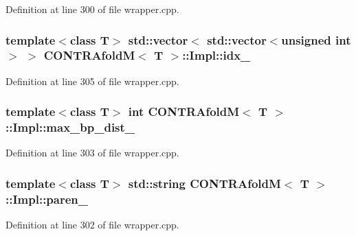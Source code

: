 Definition at line 300 of file wrapper.\+cpp.

\hypertarget{struct_c_o_n_t_r_afold_m_1_1_impl_ae0d86d3732f74d42ba6cc5993185aebb}{
\subsubsection[{idx\+\_\+}]{\setlength{\rightskip}{0pt plus 5cm}template$<$class T$>$ std\+::vector$<$ std\+::vector$<$unsigned int$>$ $>$ {\bf C\+O\+N\+T\+R\+Afold\+M}$<$ T $>$\+::Impl\+::idx\+\_\+}}\label{struct_c_o_n_t_r_afold_m_1_1_impl_ae0d86d3732f74d42ba6cc5993185aebb}


Definition at line 305 of file wrapper.\+cpp.

\hypertarget{struct_c_o_n_t_r_afold_m_1_1_impl_a9bf98e3520a857cc2f74c4c498c15f94}{
\subsubsection[{max\+\_\+bp\+\_\+dist\+\_\+}]{\setlength{\rightskip}{0pt plus 5cm}template$<$class T$>$ int {\bf C\+O\+N\+T\+R\+Afold\+M}$<$ T $>$\+::Impl\+::max\+\_\+bp\+\_\+dist\+\_\+}}\label{struct_c_o_n_t_r_afold_m_1_1_impl_a9bf98e3520a857cc2f74c4c498c15f94}


Definition at line 303 of file wrapper.\+cpp.

\hypertarget{struct_c_o_n_t_r_afold_m_1_1_impl_ad7f267d1860e0ccdeb4f5f269f1672c6}{
\subsubsection[{paren\+\_\+}]{\setlength{\rightskip}{0pt plus 5cm}template$<$class T$>$ std\+::string {\bf C\+O\+N\+T\+R\+Afold\+M}$<$ T $>$\+::Impl\+::paren\+\_\+}}\label{struct_c_o_n_t_r_afold_m_1_1_impl_ad7f267d1860e0ccdeb4f5f269f1672c6}


Definition at line 302 of file wrapper.\+cpp.

